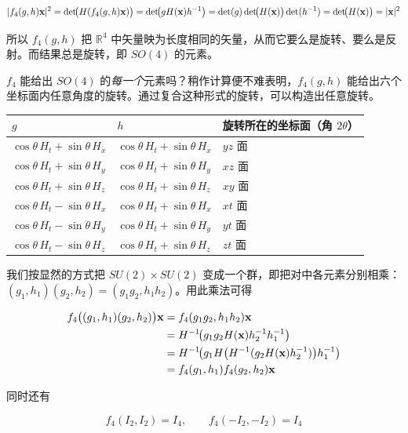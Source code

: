 \[
|f_{4}(g,h)\mathbf{x}|^{2}=\det\!\bigl(H(f_{4}(g,h)\mathbf{x})\bigr)
=\det\!\bigl(gH(\mathbf{x})h^{-1}\bigr)
=\det(g)\det\!\bigl(H(\mathbf{x})\bigr)\det(h^{-1})
=\det\!\bigl(H(\mathbf{x})\bigr)=|\mathbf{x}|^{2}
\]

所以 $f_{4}(g,h)$ 把 $\mathbb{R}^{4}$ 中矢量映为长度相同的矢量，从而它要么是旋转、要么是反射。而结果总是旋转，即 $SO(4)$ 的元素。

$f_{4}$ 能给出 $SO(4)$ 的\emph{每一个}元素吗？稍作计算便不难表明，$f_{4}(g,h)$ 能给出六个坐标面内任意角度的旋转。通过复合这种形式的旋转，可以构造出任意旋转。

\begin{center}
\begin{tabular}{lll}
\toprule
$g$ & $h$ & 旋转所在的坐标面（角 $2\theta$）\\
\midrule
$\cos\theta\,H_{t}+\sin\theta\,H_{x}$ & $\cos\theta\,H_{t}+\sin\theta\,H_{x}$ & $yz$ 面\\
$\cos\theta\,H_{t}+\sin\theta\,H_{y}$ & $\cos\theta\,H_{t}+\sin\theta\,H_{y}$ & $xz$ 面\\
$\cos\theta\,H_{t}+\sin\theta\,H_{z}$ & $\cos\theta\,H_{t}+\sin\theta\,H_{z}$ & $xy$ 面\\
$\cos\theta\,H_{t}-\sin\theta\,H_{x}$ & $\cos\theta\,H_{t}+\sin\theta\,H_{x}$ & $xt$ 面\\
$\cos\theta\,H_{t}-\sin\theta\,H_{y}$ & $\cos\theta\,H_{t}+\sin\theta\,H_{y}$ & $yt$ 面\\
$\cos\theta\,H_{t}-\sin\theta\,H_{z}$ & $\cos\theta\,H_{t}+\sin\theta\,H_{z}$ & $zt$ 面\\
\bottomrule
\end{tabular}
\end{center}

我们按显然的方式把 $SU(2)\times SU(2)$ 变成一个群，即把对中各元素分别相乘：$(g_{1},h_{1})(g_{2},h_{2})=(g_{1}g_{2},h_{1}h_{2})$。用此乘法可得

\begin{align*}
f_{4}\bigl((g_{1},h_{1})(g_{2},h_{2})\bigr)\mathbf{x}
&=f_{4}(g_{1}g_{2},h_{1}h_{2})\mathbf{x}\\
&=H^{-1}\!\bigl(g_{1}g_{2}H(\mathbf{x})h_{2}^{-1}h_{1}^{-1}\bigr)\\
&=H^{-1}\!\bigl(g_{1}H\bigl(H^{-1}(g_{2}H(\mathbf{x})h_{2}^{-1})\bigr)h_{1}^{-1}\bigr)\\
&=f_{4}(g_{1},h_{1})f_{4}(g_{2},h_{2})\mathbf{x}
\end{align*}

同时还有

\[
f_{4}(I_{2},I_{2})=I_{4},\qquad f_{4}(-I_{2},-I_{2})=I_{4}
\]

